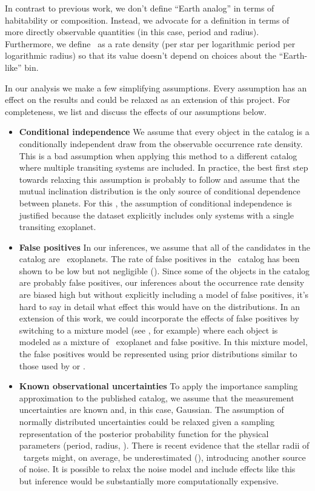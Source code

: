 In contrast to previous work, we don't define ``Earth analog'' in terms of
habitability or composition.
Instead, we advocate for a definition in terms of more directly observable
quantities (in this case, period and radius).
Furthermore, we define \gammaearth\ as a rate density (per star per
logarithmic period per logarithmic radius) so that its value doesn't depend on
choices about the ``Earth-like'' bin.

In our analysis we make a few simplifying assumptions.
Every assumption has an effect on the results and could be relaxed as an
extension of this project.
For completeness, we list and discuss the effects of our assumptions below.
\begin{itemize}

\item {\bf Conditional independence}\quad
We assume that every object in the catalog is a conditionally independent
draw from the observable occurrence rate density.
This is a bad assumption when applying this method to a different catalog
where multiple transiting systems are included.
In practice, the best first step towards relaxing this assumption is probably
to follow \citet{Tremaine:2012} and assume that the mutual inclination
distribution is the only source of conditional dependence between planets.
For this \paper, the assumption of conditional independence is justified
because the dataset explicitly includes only systems with a single transiting
exoplanet.

\item {\bf False positives}\quad
In our inferences, we assume that all of the candidates in the catalog are
\True\ exoplanets.
The rate of false positives in the \kepler\ catalog has been shown to be low
but not negligible (\citealt{Morton:2012, Fressin:2013}).
Since some of the objects in the catalog are probably false positives, our
inferences about the occurrence rate density are biased high but without
explicitly including a model of false positives, it's hard to say in detail
what effect this would have on the distributions.
In an extension of this work, we could incorporate the effects of false
positives by switching to a mixture model (see \citealt{Hogg:2010}, for
example) where each object is modeled as a mixture of \True\ exoplanet and
false positive.
In this mixture model, the false positives would be represented using prior
distributions similar to those used by \citet{Morton:2012} or
\citet{Fressin:2013}.

\item {\bf Known observational uncertainties}\quad
To apply the importance sampling approximation to the published catalog, we
assume that the measurement uncertainties are known and, in this case,
Gaussian.
The assumption of normally distributed uncertainties could be relaxed given
a sampling representation of the posterior probability function for the
physical parameters (period, radius, \etc).
There is recent evidence that the stellar radii of \kepler\ targets might, on
average, be underestimated (\citealt{Bastien:2014}), introducing another
source of noise.
It is possible to relax the noise model and include effects like this but
inference would be substantially more computationally expensive.


\end{itemize}
